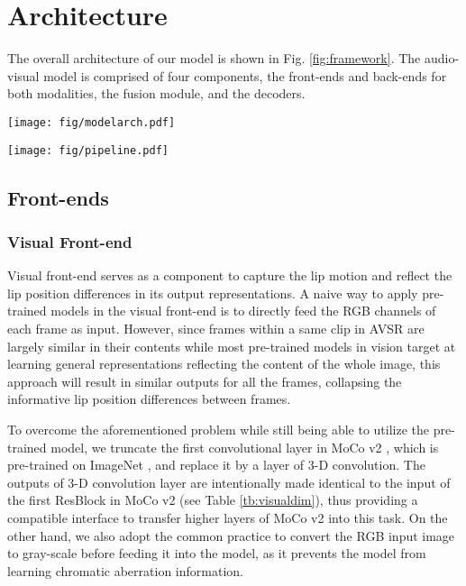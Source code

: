 \documentclass[letterpaper]{article} \usepackage{aaai22}  \usepackage{times}  \usepackage{helvet}  \usepackage{courier}  \usepackage[hyphens]{url}  \usepackage{graphicx} \urlstyle{rm} \def\UrlFont{\rm}  \usepackage{natbib}  \usepackage{caption} \usepackage{amsmath, xparse}
\begin{document}
\section{Architecture}
The overall architecture of our model is shown in Fig. \ref{fig:framework}. The audio-visual model is comprised of four components, the front-ends and back-ends for both modalities, the fusion module, and the decoders. 

\begin{figure*}[t]
\centering
\texttt{[image: fig/modelarch.pdf]}
\caption{Overall architecture of our AVSR model.}
\label{fig:framework}
\end{figure*}
\begin{figure*}[t]
\centering
\texttt{[image: fig/pipeline.pdf]}
\caption{Training pipeline of the model. Yellow blocks represent new parameters that are randomly initialized, while green blocks represent parameters that are inherited from last training stage. Blue blocks are model parts that got discarded after their corresponding training stage. }
\label{fig:pipeline}
\end{figure*}

\subsection{Front-ends}
\subsubsection{Visual Front-end}
Visual front-end serves as a component to capture the lip motion and reflect the lip position differences in its output representations. A naive way to apply pre-trained models in the visual front-end is to directly feed the RGB channels of each frame as input. However, since frames within a same clip in AVSR are largely similar in their contents while most pre-trained models in vision target at learning general representations reflecting the content of the whole image, this approach will result in similar outputs for all the frames, collapsing the informative lip position differences between frames. 

To overcome the aforementioned problem while still being able to utilize the pre-trained model, we truncate the first convolutional layer in MoCo v2 \cite{mocov2}, which is pre-trained on ImageNet \cite{imagenet}, and replace it by a layer of 3-D convolution. The outputs of 3-D convolution layer are intentionally made identical to the input of the first ResBlock in MoCo v2 (see Table \ref{tb:visualdim}), thus providing a compatible interface to transfer higher layers of MoCo v2 into this task. On the other hand, we also adopt the common practice to convert the RGB input image to gray-scale before feeding it into the model, as it prevents the model from learning chromatic aberration information.
\end{document}
